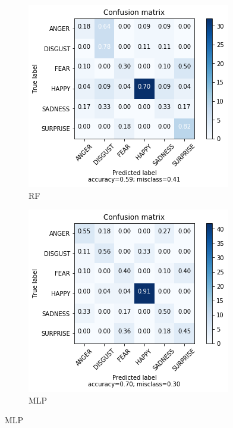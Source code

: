 \begin{figure}
\begin{subfigure}[b]{0.24\textwidth}
        \includegraphics[width=\textwidth]{figures/pca-rf.png}
        \caption{RF}
        \label{fig:pca-rf}
    \end{subfigure}
    \begin{subfigure}[b]{0.24\textwidth}
        \includegraphics[width=\textwidth]{figures/pca-mlp.png}
        \caption{MLP}
        \label{fig:pca-mlp}
    \end{subfigure}

\end{figure}
